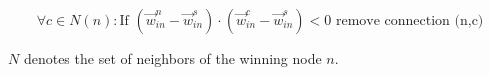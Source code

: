 \begin{equation}
\forall c \in N(n): \text{If~} (\vec{w}^n_{in}-\vec{w}^s_{in}) \cdot (\vec{w}^c_{in}-\vec{w}^s_{in}) < 0 \text{~remove connection (n,c)}
\end{equation}

$N$ denotes the set of neighbors of the winning node $n$.

